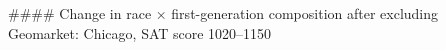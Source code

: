 #### Change in race × first-generation composition after excluding Geomarket: Chicago, SAT score 1020–1150

